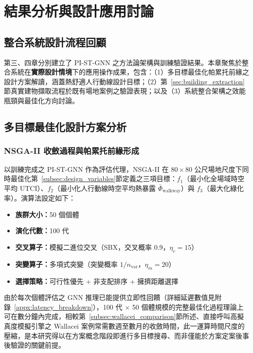 \chapter{結果分析與設計應用討論}
\label{chapter:results}

\section{整合系統設計流程回顧}
\label{sec:system_review}

第三、四章分別建立了 PI-ST-GNN 之方法論架構與訓練驗證結果。本章聚焦於整合系統在\textbf{實際設計情境}下的應用操作成果，包含：（1）多目標最佳化帕累托前緣之設計方案解讀，涵蓋熱舒適人行動線設計目標；（2）第~\ref{sec:building_extraction}節真實建物擷取流程於既有場地案例之驗證表現；以及（3）系統整合架構之效能瓶頸與最佳化方向討論。


\section{多目標最佳化設計方案分析}
\label{sec:pareto_analysis}

\subsection{NSGA-II 收斂過程與帕累托前緣形成}
\label{subsec:nsga2_convergence}

以訓練完成之 PI-ST-GNN 作為評估代理，NSGA-II 在 $80 \times 80$ 公尺場地尺度下同時最佳化第~\ref{subsec:design_variables}節定義之三項目標：$f_1$（最小化全場域時空平均 UTCI）、$f_2$（最小化人行動線時空平均熱暴露 $\bar{\Phi}_{\text{walkway}}$）與 $f_3$（最大化綠化率）。演算法設定如下：

\begin{itemize}
    \item \textbf{族群大小：}50 個個體
    \item \textbf{演化代數：}100 代
    \item \textbf{交叉算子：}模擬二進位交叉（SBX，交叉概率 0.9，$\eta_c = 15$）
    \item \textbf{突變算子：}多項式突變（突變概率 $1/n_{\text{var}}$，$\eta_m = 20$）
    \item \textbf{選擇策略：}可行性優先 + 非支配排序 + 擁擠距離選擇
\end{itemize}

由於每次個體評估之 GNN 推理已能提供立即性回饋（詳細延遲數值見附錄~\ref{appx:latency_breakdown}），100 代 $\times$ 50 個體規模的完整最佳化過程理論上可在數分鐘內完成，相較第~\ref{subsec:wallacei_comparison}節所述、直接呼叫高擬真度模擬引擎之 Wallacei 案例常需數週至數月的收斂時間，此一運算時間尺度的壓縮，是本研究得以在方案概念階段即進行多目標搜尋、而非僅能於方案定案後事後驗證的關鍵前提。

